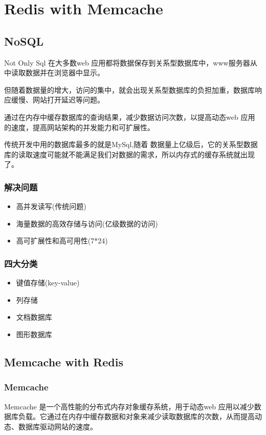 \documentclass[UTF8,a4paper,12pt]{ctexbook}
\begin{document}
\chapter{Redis with Memcache} 
	\section{NoSQL} Not Only Sql
		在大多数web 应用都将数据保存到关系型数据库中，www服务器从中读取数据并在浏览器中显示。
		
		但随着数据量的增大，访问的集中，就会出现关系型数据库的负担加重，数据库响应缓慢、网站打开延迟等问题。
		
		通过在内存中缓存数据库的查询结果，减少数据访问次数，以提高动态web 应用的速度，提高网站架构的并发能力和可扩展性。
		
		传统开发中用的数据库最多的就是MySql,随着 数据量上亿级后，它的关系型数据库的读取速度可能就不能满足我们对数据的需求，所以内存式的缓存系统就出现了。
		\subsection{解决问题}
			\begin{itemize}
				\item 高并发读写(传统问题)
				\item 海量数据的高效存储与访问(亿级数据的访问)
				\item 高可扩展性和高可用性(7*24)
			\end{itemize}
		
		\subsection{四大分类}
			\begin{itemize}
				\item 键值存储(key-value)
				\item 列存储
				\item 文档数据库
				\item 图形数据库
			\end{itemize}
	\section{Memcache with Redis}
		\subsection{Memcache}
			Memcache 是一个高性能的分布式内存对象缓存系统，用于动态web 应用以减少数据库负载。它通过在内存中缓存数据和对象来减少读取数据库的次数，从而提高动态、数据库驱动网站的速度。
		
\end{document}
